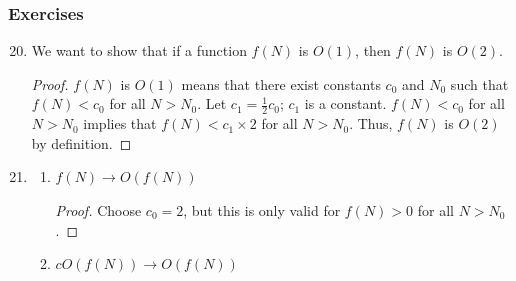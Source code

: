 \documentclass{article}
\begin{document}
\subsubsection*{Exercises}
\begin{enumerate}[label=2.\arabic*]
	\setcounter{enumi}{19}
	\item We want to show that if a function $f(N)$ is $O(1)$, then $f(N)$ is $O(2)$.
	      \begin{proof}
		      $f(N)$ is $O(1)$ means that there exist constants $c_0$ and $N_0$ such that $f(N)<c_0$ for
		      all $N>N_0$. Let $c_1=\frac{1}{2}c_0$; $c_1$ is a constant. $f(N)<c_0$ for all $N>N_0$
		      implies that $f(N)<c_1\times2$ for all $N>N_0$. Thus, $f(N)$ is $O(2)$ by definition.
	      \end{proof}
	\item \begin{enumerate}
		      \item $f(N) \to O(f(N))$
		            \begin{proof}
			            Choose $c_0=2$, but this is only valid for $f(N)>0$ for all $N>N_0$.
		            \end{proof}
		      \item $cO(f(N))\to O(f(N))$
	      \end{enumerate}
\end{enumerate}
\end{document}
